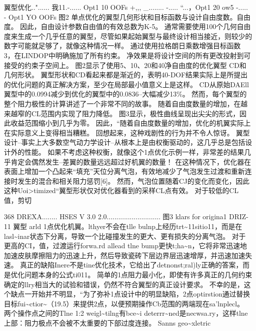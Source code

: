 \documentclass[UTF8,11pt,a4paper,openany,fontset=fandol]{ctexbook}
\begin{document}
翼型优化.."...... 我11.-...... Opt1 10 OOFs +,,, \_........ -..... “...，Opt1 20 ow5 -..... - Opt1 YO OOFs 图2 单点优化的翼型几何形状和目标函数与设计自由度数。自由度。 因此，自由设计参数自由值的有效总数为K-5。 通常需要使用100个几何自由度来生成一个几乎任意的翼型，尽管如果起始翼型与最终设计相当接近，则较少的数字可能就足够了，就像这种情况一样。 通过使用拉格朗日乘数增强目标函数 3，在LINDOP中明确施加了所有约束。 净效果是将设计空间的所有更改投射到可接受的约束子空间上。 图2显示了使用5、10、20和40净自由度的优化翼型 CD和几何形状。 翼型形状和CD看起来都是渐近的，表明40-DOF结果实际上是所提出的优化问题的真正解决方案，至少在局部最小值意义上是这样。 CD从原始DAEll 翼型中的0.0994减少到优化的翼型中的0.0836--大幅减少13\%。 然而，每个翼型的整个阻力极性的计算讲述了一个非常不同的故事。 随着自由度数量的增加，在越来越窄的CL范围内实现了阻力降低。 图3显示，极性曲线呈现出尖尖的形式，因此收益范围缩小到几乎为零。 因此，“随着自由度数量的增加，优化的机翼实际上在实际意义上变得相当糟糕。 回想起来，这种戏剧性的行为并不令人惊讶。 翼型设计--事实上大多数空气动力学设计--从根本上是由权衡驱动的，这几乎总是包括设计外的性能。 如果不考虑这种权衡，就像这个1点优化示例一样，非常差的结果几乎肯定会偶然发生--差翼的数量远远超过好机翼的数量！ 在这种情况下，优化器在表面上增加一个凸起来“填充”天位分离气泡，有效地减少了气泡发生过渡和重新连接时发生的混合和相关阻力惩罚[6]。 然而，气泡位置随着CJ的变化而变化，因此这种Uoi>timized“翼型形状仅对优化器看到的采样CL点有效。 对于较低的CL值，剪切

368 DREXA........ HSES V 3.0 2.0............................ 图3 klars for origina1 DRIZ-11 翼型 arld 1点优化机翼。lthyer不会在tlle bulnp上经历trt\textasciitilde{}11sitio11，而是在lasl\textasciitilde{}inar状态下分离，导致一个比碰撞发生的更大、更有损失的分离气泡。 对于更高的CI，值，过渡运行forwa.rd allead tlne bump更快t;ha\textasciitilde{}n，它将非常迅速地加速皮肤摩擦阻力的迅速上升，然后导致瓷砖下层边界层迅速增厚，并迅速加速失速。 真正的缺陷Inere不是tine优化技术，它给出了detnonst;ral)ly正确的答案，而是优化问题本身的公式ti011。 简单的1点阻力最小化，即使有许多真正的几何约束确定的llry相当大的试验和错误，仍然不符合翼型的真正设计要求。 不幸的是，这个缺点一开始并不明显，“为了弥补1点设计中的明显缺陷，2点optirstion通过替换目标fui\textasciitilde{}ctior\textasciitilde{}（19.5）来提供2点，以便预期操作Cb范围的两端现在sa'lnplecl。 两个操作点之间的Tlne 1:2 weigl\textasciitilde{}tilng有bce\textasciitilde{}i deterrr\textasciitilde{}ned是necwsa.ry，这样tlne上部：阻力极点不会被不太重要的下部过度连接。 Sanns geo\textasciitilde{}xletric
\end{document}
